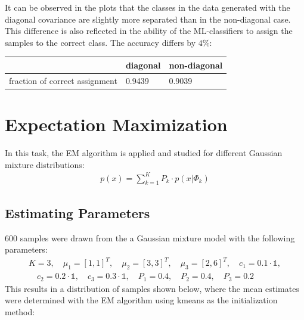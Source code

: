 \documentclass[DIV=12, ngerman, fontsize=12pt, parskip=half]{scrreprt}
\begin{document}
	It can be observed in the plots that the classes in the data generated with the diagonal covariance are slightly more separated than in the non-diagonal case. This difference is also reflected in the ability of the ML-classifiers to assign the samples to the correct class. The accuracy differs by $4\%$:
	
	\begin{table}[H]
	\begin{center}	
		\begin{tabular}{|l|l|l|}
			\hline
			& diagonal & non-diagonal \\
			\hline
			fraction of correct assignment & 0.9439   & 0.9039      \\
			\hline
		\end{tabular}
	\end{center}
	\end{table}

	
	
	{\let\clearpage\relax \chapter{Expectation Maximization}}
	In this task, the EM algorithm is applied and studied for different Gaussian mixture distributions:
	\begin{align*}
		p(x) = \sum_{k=1}^{K}P_k \cdot p(x|\Phi_k)
	\end{align*}

	
	\section{Estimating Parameters}
	600 samples were drawn from the a Gaussian mixture model with the following parameters: 
	\begin{align*}
		K = 3, \quad \mu_1 = [1,1]^T, \quad \mu_2 = [3,3]^T, \quad \mu_3 = [2,6]^T, \quad c_1 = 0.1 \cdot \mathbb{1},\\ \quad c_2 = 0.2 \cdot \mathbb{1}, \quad c_3 = 0.3 \cdot \mathbb{1}, \quad P_1 = 0.4, \quad P_2 = 0.4, \quad P_3 = 0.2
	\end{align*}
	This results in a distribution of samples shown below, where the mean estimates were determined with the EM algorithm using kmeans as the initialization method:
	
\end{document}
